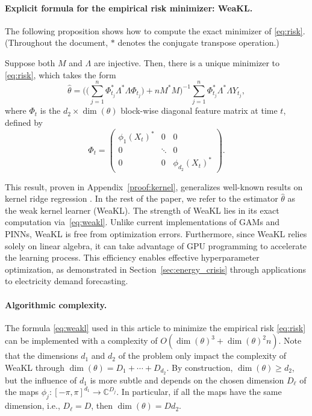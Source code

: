 \paragraph{Explicit formula for the empirical risk minimizer: WeaKL.}The following proposition shows how to compute the exact minimizer of \eqref{eq:risk}. 
(Throughout the document, $\ast$ denotes the conjugate transpose operation.)
\begin{proposition} 
\label{prop:emp_risk_min}
Suppose both $M$ and $\Lambda$ are injective.
Then, there is a unique minimizer to \eqref{eq:risk}, which takes the form
\begin{equation}
    \hat \theta = \Big( \Big( \sum_{j=1}^n \mathbb \Phi_{t_j}^\ast \Lambda^\ast \Lambda\mathbb \Phi_{t_j}\Big) + n M^\ast M\Big)^{-1} \sum_{j=1}^n \mathbb \Phi_{t_j}^\ast \Lambda^\ast \Lambda Y_{t_j},
    \label{eq:weakl}
\end{equation}
where $\mathbb \Phi_t$ is the $d_2\times \dim(\theta)$ block-wise diagonal feature matrix at time $t$, defined by
\begin{equation}
\mathbb \Phi_t = \begin{pmatrix}
    \phi_1(X_{t})^\ast & 0& 0 \\
    0 & \ddots & 0 \\
    0 & 0 & \phi_{d_2}(X_{t})^\ast
\end{pmatrix}
\label{eq:feature_matrix}.
\end{equation}
\end{proposition}
This result, proven in Appendix~\ref{proof:kernel}, generalizes well-known results on kernel ridge regression \citep[see, e.g.,][Equation 10.17]{mehri2012foundations}. 
In the rest of the paper, we refer to the estimator $\hat \theta$ as the weak kernel learner (WeaKL). The strength of WeaKL lies in its exact computation via~\eqref{eq:weakl}. Unlike current implementations of GAMs and PINNs, WeaKL is free from optimization errors. Furthermore, since WeaKL relies solely on linear algebra, it can take advantage of GPU programming to accelerate the learning process. 
This efficiency enables effective hyperparameter optimization, as demonstrated in Section~\ref{sec:energy_crisis} through applications to electricity demand forecasting.

\paragraph{Algorithmic complexity.} The formula \eqref{eq:weakl} used in this article to minimize the empirical risk \eqref{eq:risk} can be implemented with a  complexity of $ O(\dim(\theta)^3 +  \dim(\theta)^2 n)$. 
Note that the dimensions $d_1$ and $d_2$ of the problem only impact the complexity of WeaKL through $\dim(\theta) = D_1 + \cdots + D_{d_2}$. 
By construction, $\dim(\theta) \geq d_2$, but the influence of $d_1$ is more subtle and depends on the chosen dimension $D_\ell$ of the maps $\phi_j: [-\pi, \pi]^{d_1}\to \mathbb{C}^{D_j}$. 
In particular, if all the maps have the same dimension, i.e., $D_\ell = D$, then $\dim(\theta) = Dd_2$.

